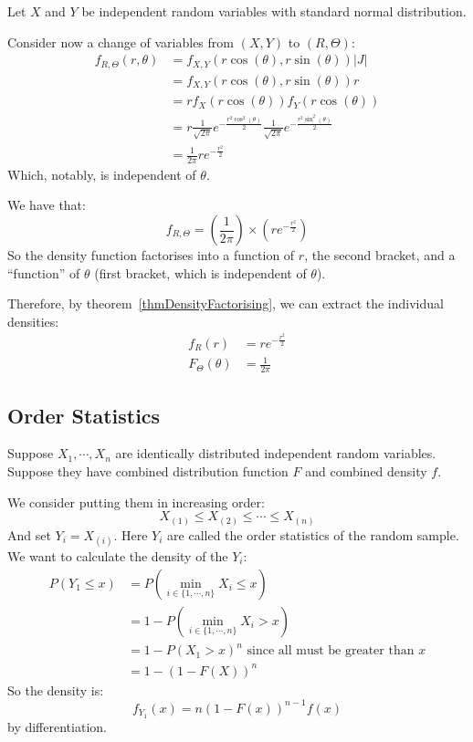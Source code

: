 \documentclass[../Main.tex]{subfiles}
\begin{document}
\begin{example}
    Let $X$ and $Y$ be independent random variables with standard normal distribution.\par
    Consider now a change of variables from $(X, Y)$ to $(R, \Theta)$:
    \begin{align*}
        f_{R, \Theta}(r, \theta) &= f_{X, Y}(r \cos(\theta), r\sin(\theta)) |J| \\
        &= f_{X, Y}(r \cos(\theta), r\sin(\theta)) r \\
        &= rf_X(r\cos(\theta)) f_Y(r \cos(\theta)) \\
        &= r\frac{1}{\sqrt{2\pi}} e^{-\frac{r^2 \cos^2(\theta)}{2}} \frac{1}{\sqrt{2\pi}} e^{-\frac{r^2 \sin^2(\theta)}{2}} \\
        &= \frac{1}{2\pi} r e^{-\frac{r^2}{2}}
    \end{align*}
    Which, notably, is independent of $\theta$.\par
    We have that:
    \begin{equation*}
        f_{R, \Theta} = \left(\frac{1}{2\pi}\right) \times \left(re^{-\frac{r^2}{2}}\right)
    \end{equation*}
    So the density function factorises into a function of $r$, the second bracket, and a ``function'' of $\theta$ (first bracket, which is independent of $\theta$).

    Therefore, by theorem~\ref{thmDensityFactorising}, we can extract the individual densities:
    \begin{align*}
        f_R(r) &= re^{-\frac{r^2}{2}} \\
        F_\Theta(\theta) &= \frac{1}{2\pi}
    \end{align*}
\end{example}
\subsection{Order Statistics}
Suppose $X_1, \cdots, X_n$ are identically distributed independent random variables. Suppose they have combined distribution function $F$ and combined density $f$.

We consider putting them in increasing order:
\begin{equation*}
    X_{(1)} \leq X_{(2)} \leq \cdots \leq X_{(n)}
\end{equation*}
And set $Y_i = X_{(i)}$. Here $Y_i$ are called the order statistics of the random sample. We want to calculate the density of the $Y_i$:
\begin{align*}
    P(Y_1 \leq x) &= P(\min_{i \in \{1, \cdots, n\}} X_i \leq x) \\
    &= 1 - P(\min_{i \in \{1, \cdots, n\}} X_i > x) \\ 
    &= 1 - P(X_1 > x)^n \text{ since all must be greater than } x \\
    &= 1 - (1 - F(X))^n
\end{align*}
So the density is:
\begin{equation*}
    f_{Y_1}(x) = n(1 - F(x))^{n-1} f(x)
\end{equation*}
by differentiation.
\end{document}
